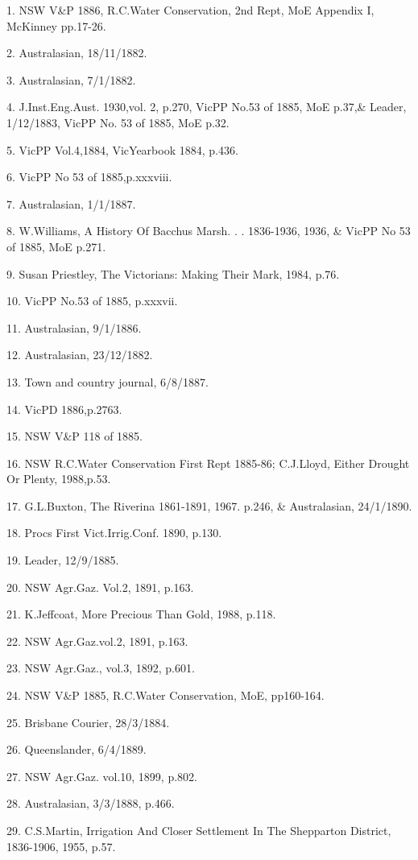 1. NSW V\&P 1886, R.C.Water Conservation, 2nd Rept, MoE Appendix I,
    McKinney pp.17-26.	        

2. Australasian, 18/11/1882.

3. Australasian, 7/1/1882.

4. J.Inst.Eng.Aust. 1930,vol. 2, p.270, VicPP No.53 of 1885, MoE p.37,\&
    Leader, 1/12/1883, VicPP No. 53 of 1885, MoE p.32.

5. VicPP Vol.4,1884, VicYearbook 1884, p.436. 

6. VicPP No 53 of 1885,p.xxxviii.

7. Australasian, 1/1/1887.

8. W.Williams, A History Of Bacchus Marsh. . . 1836-1936, 1936,  \& 
    VicPP No 53 of 1885, MoE p.271.

9. Susan Priestley, The Victorians: Making Their Mark, 1984, p.76.

10. VicPP No.53 of 1885, p.xxxvii.

11. Australasian, 9/1/1886.

12. Australasian, 23/12/1882.

13. Town and country journal, 6/8/1887.

14. VicPD 1886,p.2763.

15. NSW V\&P 118 of 1885.

16. NSW R.C.Water Conservation First Rept 1885-86; C.J.Lloyd, Either
      Drought Or Plenty, 1988,p.53.  

17. G.L.Buxton, The Riverina 1861-1891, 1967. p.246, \&  Australasian,
      24/1/1890.

18.  Procs First Vict.Irrig.Conf. 1890, p.130.

19. Leader, 12/9/1885.

20. NSW Agr.Gaz. Vol.2, 1891, p.163.

21. K.Jeffcoat, More Precious Than Gold, 1988, p.118.

22. NSW Agr.Gaz.vol.2, 1891, p.163.

23. NSW Agr.Gaz., vol.3, 1892, p.601.

24. NSW V\&P 1885, R.C.Water Conservation, MoE, pp160-164.

25. Brisbane Courier, 28/3/1884.

26. Queenslander, 6/4/1889.

27. NSW Agr.Gaz. vol.10, 1899, p.802.

28. Australasian, 3/3/1888, p.466.

29. C.S.Martin, Irrigation And Closer Settlement In The Shepparton District,
      1836-1906, 1955, p.57.

